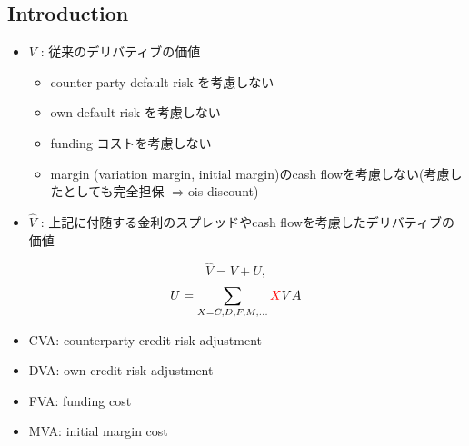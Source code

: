 \documentclass[driverfallback=dvipdfmx,cjk]{beamer}
\begin{document}
\subsection{Introduction}
\begin{frame} 
    \begin{itemize}
        \item $V$ : 従来のデリバティブの価値
            \begin{itemize}
                \item counter party default risk を考慮しない
                \item own default risk を考慮しない
                \item funding コストを考慮しない
                \item margin (variation margin, initial margin)のcash flowを考慮しない(考慮したとしても完全担保 $\Rightarrow$ois discount)
            \end{itemize}
        \item $\hat{V}$ : 上記に付随する金利のスプレッドやcash flowを考慮したデリバティブの価値
    \end{itemize}
    $$\hat{V} = V + U, $$
    $$U = \sum_{X=C, D, F, M, ...} \textcolor{red}{X}VA$$
    \begin{itemize}
        \item CVA: counterparty credit risk adjustment
        \item DVA: own credit risk adjustment
        \item FVA: funding cost
        \item MVA: initial margin cost
    \end{itemize}
\end{frame}
\end{document}
